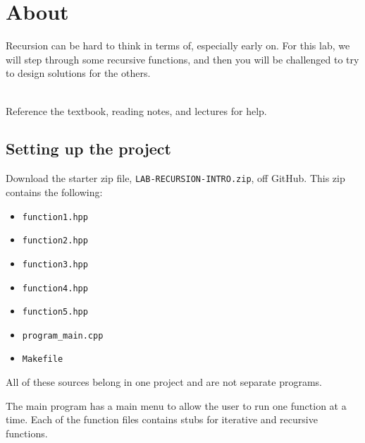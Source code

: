 
\newcommand{\laClass}       {CS 250}
\newcommand{\laSemester}    {Spring 2018}
\newcommand{\laChapter}     {}
\newcommand{\laType}        {Lab}
\newcommand{\laAssignment}  {}
\newcommand{\laPoints}      {5}
\newcommand{\laTitle}       {Recursion}
\newcommand{\laStarterFiles}{Download from GitHub.}
\newcommand{\laTopics}      {Writing simple recursive functions}
\setcounter{chapter}{1}
\setcounter{section}{1}
\addtocounter{section}{-1}
\toggletrue{answerkey}
\togglefalse{answerkey}




\section{About}

Recursion can be hard to think in terms of, especially early on.
For this lab, we will step through some recursive functions,
and then you will be challenged to try to design solutions for the others.

~\\ Reference the textbook, reading notes, and lectures for help.

\hrulefill

\subsection{Setting up the project}

Download the starter zip file, \texttt{LAB-RECURSION-INTRO.zip}, off GitHub.
This zip contains the following:

\begin{itemize}
    \item   \texttt{function1.hpp}
    \item   \texttt{function2.hpp}
    \item   \texttt{function3.hpp}
    \item   \texttt{function4.hpp}
    \item   \texttt{function5.hpp}
    \item   \texttt{program\_main.cpp}
    \item   \texttt{Makefile}
\end{itemize}

All of these sources belong in one project and are not separate programs.

The main program has a main menu to allow the user to run one function
at a time. Each of the function files contains stubs for iterative
and recursive functions.

